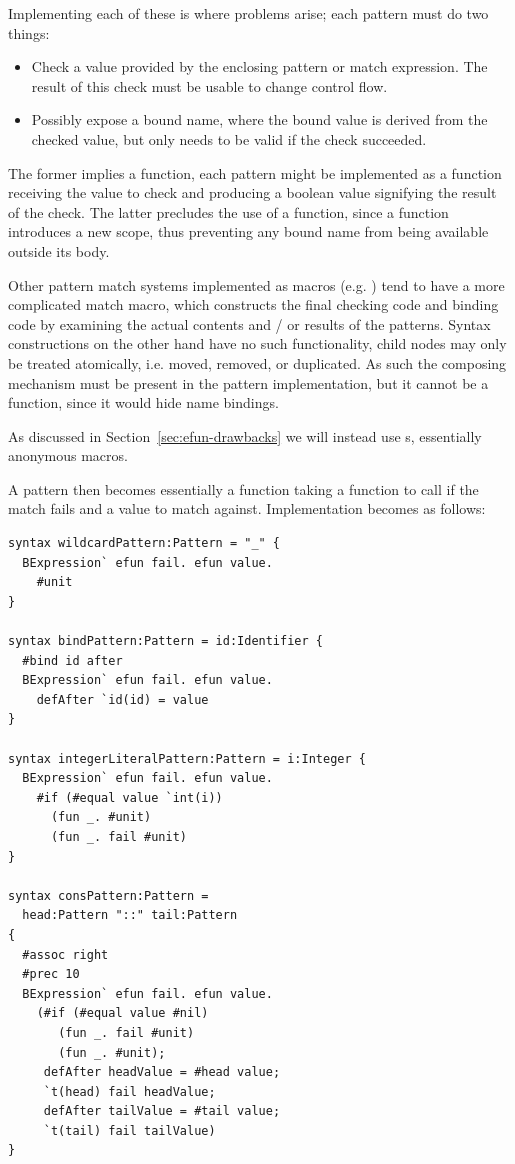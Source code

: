\documentclass{kththesis}
\begin{document}

Implementing each of these is where problems arise; each pattern must do two things:

\begin{itemize}
  \item Check a value provided by the enclosing pattern or match expression. The result of this check must be usable to change control flow.
  \item Possibly expose a bound name, where the bound value is derived from the checked value, but only needs to be valid if the check succeeded.
\end{itemize}

The former implies a function, each pattern might be implemented as a function receiving the value to check and producing a boolean value signifying the result of the check. The latter precludes the use of a function, since a function introduces a new scope, thus preventing any bound name from being available outside its body.

Other pattern match systems implemented as macros (e.g. \cite{Tobin-Hochstadt2011Extensible-Patt}) tend to have a more complicated match macro, which constructs the final checking code and binding code by examining the actual contents and / or results of the patterns. Syntax constructions on the other hand have no such functionality, child nodes may only be treated atomically, i.e. moved, removed, or duplicated. As such the composing mechanism must be present in the pattern implementation, but it cannot be a function, since it would hide name bindings.

As discussed in Section~\ref{sec:efun-drawbacks} we will instead use s, essentially anonymous macros.

A pattern then becomes essentially a function taking a function to call if the match fails and a value to match against. Implementation becomes as follows:

\begin{verbatim}
syntax wildcardPattern:Pattern = "_" {
  BExpression` efun fail. efun value.
    #unit
}

syntax bindPattern:Pattern = id:Identifier {
  #bind id after
  BExpression` efun fail. efun value.
    defAfter `id(id) = value
}

syntax integerLiteralPattern:Pattern = i:Integer {
  BExpression` efun fail. efun value.
    #if (#equal value `int(i))
      (fun _. #unit)
      (fun _. fail #unit)
}

syntax consPattern:Pattern =
  head:Pattern "::" tail:Pattern
{
  #assoc right
  #prec 10
  BExpression` efun fail. efun value.
    (#if (#equal value #nil)
       (fun _. fail #unit)
       (fun _. #unit);
     defAfter headValue = #head value;
     `t(head) fail headValue;
     defAfter tailValue = #tail value;
     `t(tail) fail tailValue)
}
\end{verbatim}
\end{document}
